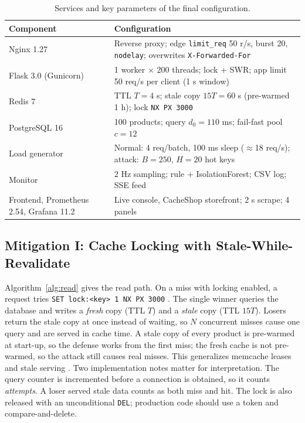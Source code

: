 \documentclass[journal]{IEEEtran}
\begin{document}
\begin{table}[t]
\centering
\caption{Services and key parameters of the final configuration.}
\label{tab:params}
\footnotesize
\begin{tabularx}{\columnwidth}{@{}L{2.2cm}Y@{}}
\toprule
Component & Configuration \\
\midrule
Nginx 1.27 & Reverse proxy; edge \texttt{limit\_req} 50 r/s, burst 20, \texttt{nodelay}; overwrites \texttt{X-Forwarded-For} \\
Flask 3.0 (Gunicorn) & 1 worker $\times$ 200 threads; lock + SWR; app limit 50 req/s per client (1 s window) \\
Redis 7 & TTL $T=4$ s; stale copy $15T=60$ s (pre-warmed 1 h); lock \texttt{NX PX 3000} \\
PostgreSQL 16 & 100 products; query $d_0=110$ ms; fail-fast pool $c=12$ \\
Load generator & Normal: 4 req/batch, 100 ms sleep ($\approx$18 req/s); attack: $B=250$, $H=20$ hot keys \\
Monitor & 2 Hz sampling; rule + IsolationForest; CSV log; SSE feed \\
Frontend, Prometheus 2.54, Grafana 11.2 & Live console, CacheShop storefront; 2 s scrape; 4 panels \\
\bottomrule
\end{tabularx}
\end{table}

\subsection{Mitigation I: Cache Locking with Stale-While-Revalidate}
Algorithm~\ref{alg:read} gives the read path. On a miss with locking enabled, a request
tries \texttt{SET lock:<key> 1 NX PX 3000} \cite{redisdocs}. The single winner queries
the database and writes a \emph{fresh} copy (TTL $T$) and a \emph{stale} copy (TTL
$15T$). Losers return the stale copy at once instead of waiting, so $N$ concurrent
misses cause one query and are served in cache time. A stale copy of every product is
pre-warmed at start-up, so the defense works from the first miss; the fresh cache is not
pre-warmed, so the attack still causes real misses. This generalizes memcache leases
\cite{nishtala2013} and stale serving \cite{rfc5861}. Two implementation
notes matter for interpretation. The query counter is incremented before a connection is
obtained, so it counts \emph{attempts}. A loser served stale data counts as both miss and
hit. The lock is also released with an unconditional \texttt{DEL}; production code
should use a token and compare-and-delete.
\end{document}
